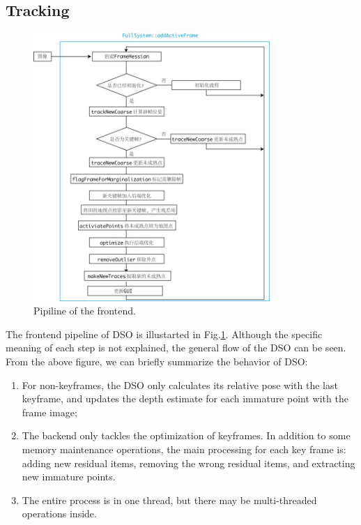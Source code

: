 \documentclass[a4paper,10pt]{article}
\begin{document}
	\subsection{Tracking}
	\begin{figure}[!thp]
	\centering
	\label{fig:frontend-dso}
	\includegraphics[width=0.8\textwidth]{figs/frontend-cn.jpg}
	\caption{Pipiline of the frontend.}
	\end{figure}
	The frontend pipeline of DSO is illustarted in Fig.\ref{fig:frontend-dso}. Although the specific meaning of each step is not explained, the general flow of the DSO can be seen. From the above figure, we can briefly summarize the behavior of DSO:
	
	\begin{enumerate}
		\item For non-keyframes, the DSO only calculates its relative pose with the last keyframe, and updates the depth estimate for each immature point with the frame image;
		\item The backend only tackles the optimization of keyframes. In addition to some memory maintenance operations, the main processing for each key frame is: adding new residual items, removing the wrong residual items, and extracting new immature points.
		\item The entire process is in one thread, but there may be multi-threaded operations inside.
	\end{enumerate}
	
\end{document}
